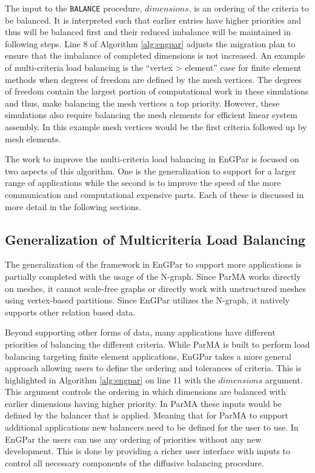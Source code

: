 The input to the \texttt{BALANCE}
procedure, $dimensions$, is an ordering of the criteria
to be balanced. It is interpreted such that earlier
entries have higher priorities and thus will be balanced
first and their reduced imbalance will be maintained in following
steps. Line 8
of Algorithm \ref{alg:engpar} adjusts the migration plan to
ensure that the imbalance of completed dimensions is not
increased. An example of multi-criteria load balancing
is the ``vertex > element'' case for finite element
methods when degrees of freedom are defined by the mesh vertices.
The degrees of freedom contain the largest
portion of computational work in these simulations
and thus, make balancing the mesh vertices a top
priority. However, these simulations also require balancing
the mesh elements for efficient linear system assembly.
In this example mesh vertices would be the first criteria
followed up by mesh elements.

The work to improve the multi-criteria load
balancing in EnGPar is focused
on two aspects of this algorithm. One is the
generalization to support for a larger range of applications
while the second is to improve the speed of the
more communication and computational expensive parts.
Each of these is discussed in more detail in the following sections.

\subsection{Generalization of Multicriteria Load Balancing}
The generalization of the framework in EnGPar to support more
applications is partially completed with the usage of the N-graph.
Since ParMA works directly on meshes, it cannot 
scale-free graphs \cite{pienta2013parallel,gonzalez2012powergraph}
or directly work with unstructured
meshes using vertex-based partitions. Since EnGPar utilizes
the N-graph, it natively
supports other relation based data.

Beyond supporting other forms of data, many applications have
different priorities of balancing the different criteria. While
ParMA is built to perform load balancing targeting finite element
applications, EnGPar takes a more general approach
allowing users to define the ordering and tolerances of criteria.
This is highlighted in Algorithm \ref{alg:engpar} on line 11 with
the $dimensions$ argument. This argument controls the ordering in
which dimensions are balanced with earlier dimensions having higher
priority. In ParMA these inputs would be defined by the balancer
that is applied. Meaning that for ParMA to support additional
applications new balancers need to be defined for the user to use.
In EnGPar the users can use any ordering of priorities
without any new development. This is done by providing
a richer user interface with inputs to control all
necessary components of the diffusive balancing procedure.

